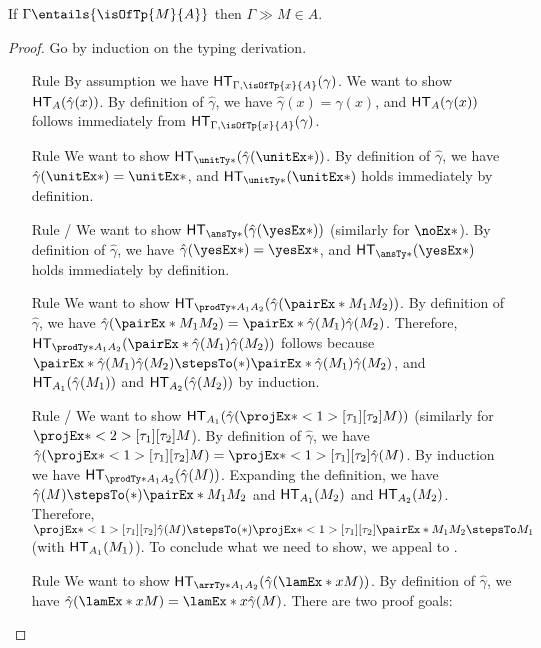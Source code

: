\documentclass[letterpaper]{article}
\begin{document}
\begin{theorem}\label{thm:fundamental}
If $\Gamma \entails{\isOfTp{M}{A}}$ then $\Gamma \gg M \in A$.
\end{theorem}
\begin{proof}
Go by induction on the typing derivation.
\begin{enumerate}
  \item [Rule \ruleref{sta:var}] By assumption we have $\HT[\Gamma, \isOfTp{x}{A}](\gamma)$. We want to show $\HT[A](\hat{\gamma}(x))$. By definition of $\hat{\gamma}$, we have $\hat{\gamma}(x) = \gamma(x)$, and $\HT[A](\gamma(x))$ follows immediately from $\HT[\Gamma, \isOfTp{x}{A}](\gamma)$.
  \item [Rule \ruleref{sta:triv}] We want to show $\HT[\unitTy*](\hat{\gamma}(\unitEx*))$. By definition of $\hat{\gamma}$, we have $\hat{\gamma}(\unitEx*) = \unitEx*$, and $\HT[\unitTy*](\unitEx*)$ holds immediately by definition.
  \item [Rule \ruleref{sta:ans1}/\ruleref{sta:ans2}] We want to show $\HT[\ansTy*](\hat{\gamma}(\yesEx*))$ (similarly for $\noEx*$). By definition of $\hat{\gamma}$, we have $\hat{\gamma}(\yesEx*) = \yesEx*$, and $\HT[\ansTy*](\yesEx*)$ holds immediately by definition.
  \item [Rule \ruleref{sta:pair}] We want to show $\HT[\prodTy*{A_1}{A_2}](\hat{\gamma}(\pairEx*{M_1}{M_2}))$. By definition of $\hat{\gamma}$, we have $\hat{\gamma}(\pairEx*{M_1}{M_2}) = \pairEx*{\hat{\gamma}(M_1)}{\hat{\gamma}(M_2)}$. Therefore, $\HT[\prodTy*{A_1}{A_2}](\pairEx*{\hat{\gamma}(M_1)}{\hat{\gamma}(M_2)})$ follows because $\pairEx*{\hat{\gamma}(M_1)}{\hat{\gamma}(M_2)} \stepsTo(*) \pairEx*{\hat{\gamma}(M_1)}{\hat{\gamma}(M_2)}$, and $\HT[A_1](\hat{\gamma}(M_1))$ and $\HT[A_2](\hat{\gamma}(M_2))$ by induction.
  \item [Rule \ruleref{sta:prl}/\ruleref{sta:prr}] We want to show $\HT[A_1](\hat{\gamma}(\fstEx*{M}))$ (similarly for $\sndEx*{M}$). By definition of $\hat{\gamma}$, we have $\hat{\gamma}(\fstEx*{M}) = \fstEx*{\hat{\gamma}(M)}$. By induction we have $\HT[\prodTy*{A_1}{A_2}](\hat{\gamma}(M))$. Expanding the definition, we have $\hat{\gamma}(M) \stepsTo(*) \pairEx*{M_1}{M_2}$ and $\HT[A_1](M_2)$ and $\HT[A_2](M_2)$. Therefore, $\fstEx*{\hat{\gamma}(M)} \stepsTo(*) \fstEx*{\pairEx*{M_1}{M_2}} \stepsTo M_1$ (with $\HT[A_1](M_1)$). To conclude what we need to show, we appeal to .
  \item [Rule \ruleref{sta:abs}] We want to show $\HT[\arrTy*{A_1}{A_2}](\hat{\gamma}(\lamEx*{x}{M}))$. By definition of $\hat{\gamma}$, we have $\hat{\gamma}(\lamEx*{x}{M}) = \lamEx*{x}{\hat{\gamma}(M)}$. There are two proof goals:

\end{enumerate}
\end{proof}
\end{document}
